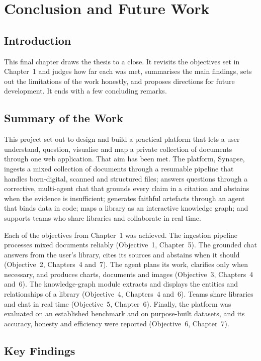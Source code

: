 \chapter{Conclusion and Future Work}
\label{ch:conclusion}

\section{Introduction}

This final chapter draws the thesis to a close. It revisits the objectives set in
Chapter~1 and judges how far each was met, summarises the main findings, sets out
the limitations of the work honestly, and proposes directions for future
development. It ends with a few concluding remarks.

\section{Summary of the Work}

This project set out to design and build a practical platform that lets a user
understand, question, visualise and map a private collection of documents through
one web application. That aim has been met. The platform, Synapse, ingests a mixed
collection of documents through a resumable pipeline that handles born-digital,
scanned and structured files; answers questions through a corrective, multi-agent
chat that grounds every claim in a citation and abstains when the evidence is
insufficient; generates faithful artefacts through an agent that binds data in
code; maps a library as an interactive knowledge graph; and supports teams who
share libraries and collaborate in real time.

Each of the objectives from Chapter~1 was achieved. The ingestion pipeline
processes mixed documents reliably (Objective~1, Chapter~5). The grounded chat
answers from the user's library, cites its sources and abstains when it should
(Objective~2, Chapters~4 and~7). The agent plans its work, clarifies only when
necessary, and produces charts, documents and images (Objective~3, Chapters~4
and~6). The knowledge-graph module extracts and displays the entities and
relationships of a library (Objective~4, Chapters~4 and~6). Teams share libraries
and chat in real time (Objective~5, Chapter~6). Finally, the platform was
evaluated on an established benchmark and on purpose-built datasets, and its
accuracy, honesty and efficiency were reported (Objective~6, Chapter~7).

\section{Key Findings}

